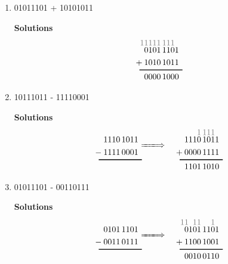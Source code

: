 \begin{enumerate}
\begin{enumerate}
                \item 01011101 + 10101011

                    \begin{onlysolution} \textbf{Solutions}
                        \begin{align*}
                            {\color{gray}
                            11111\,111\0}&\\[-1.5ex]
                            0101\,1101&\\
                            +\:1010\,1011&\\[-2ex]
                            \rule{12ex}{1pt}\hspace{-1ex}&\\[-1ex]
                            0000\,1000&
                        \end{align*}
                    \end{onlysolution}

                \item 10111011 - 11110001

                    \begin{onlysolution} \textbf{Solutions}
                        \begin{alignat*}{3}
                            &&{\color{gray}
                            1\,111\0 }\\[-1.5ex]
                            1110\,1011&   &1110\,1011\\
                            -\:1111\,0001&&+\:0000\,1111\\[-2ex]
                            \rule{12ex}{1pt}\hspace{-1ex}&\ \raisebox{3.5ex}[0pt][0pt]{$\xLongrightarrow{\phantom{80em}}$}\ &\rule{12ex}{1pt}\hspace{-1ex}\\[-1ex]
                            & &1101\,1010
                        \end{alignat*}
                    \end{onlysolution}

                \item 01011101 - 00110111

                    \begin{onlysolution} \textbf{Solutions}
                        \begin{alignat*}{3}
                            &&{\color{gray}
                            11\011\9\01\0 }\\[-1.5ex]
                            0101\,1101&&   0101\,1101\\
                            -\:0011\,0111&&+\:1100\,1001\\[-2ex]
                            \rule{12ex}{1pt}\hspace{-1ex}&\ \raisebox{3.5ex}[0pt][0pt]{$\xLongrightarrow{\phantom{80em}}$}\ &\rule{12ex}{1pt}\hspace{-1ex}\\[-1ex]
                            &&   0010\,0110
                        \end{alignat*}
                    \end{onlysolution}


\end{enumerate}
\end{enumerate}
